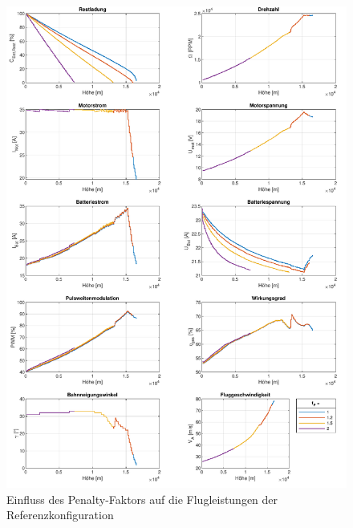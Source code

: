 \begin{figure}[H]
\centering
	\includegraphics[scale=0.7]{Diagramme/Flaechenflzg_fp.pdf}
	\caption{Einfluss des Penalty-Faktors auf die Flugleistungen der Referenzkonfiguration}
	\label{abb:fp}
\end{figure}


